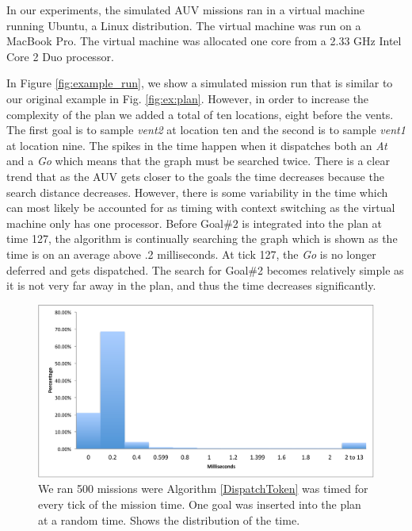 In our experiments, the simulated AUV missions ran in a virtual machine running Ubuntu, a Linux distribution. The virtual machine
was run on a MacBook Pro. The virtual machine was allocated one core from a 2.33 GHz Intel Core 2 Duo processor. 

In Figure \ref{fig:example_run}, we show a simulated mission run that is similar to our original example in Fig. \ref{fig:ex:plan}.
However, in order to increase the complexity of the plan we added a total of ten locations, eight before the vents. The first goal 
is to sample {\em vent2} at location ten and the second is to sample {\em vent1} at location nine. The spikes in the time 
happen when it dispatches both an {\em At} and a {\em Go} which means that the graph must be searched twice. There
is a clear trend that as the AUV gets closer to the goals the time decreases because the search distance decreases. 
However, there is some variability in the time which can most likely be accounted for as timing with context switching as the virtual
machine only has one processor. Before Goal\#2 is integrated into the plan at time 127, the algorithm is continually
searching the graph which is shown as the time is on an average above .2 milliseconds. At tick 127, the {\em Go} is no longer 
deferred and gets dispatched. The search for Goal\#2 becomes relatively simple as it is not very far away in the plan, and thus the
time decreases significantly.

\begin{figure}
\centering
\includegraphics[width=\columnwidth]{figs/HistogramAlg1}
\caption{\small  We ran 500 missions were Algorithm \ref{DispatchToken} was timed for every tick of the mission time.
One goal was inserted into the plan at a random time. Shows the distribution of the time.} 
  \label{fig:histogram}
\end{figure}

